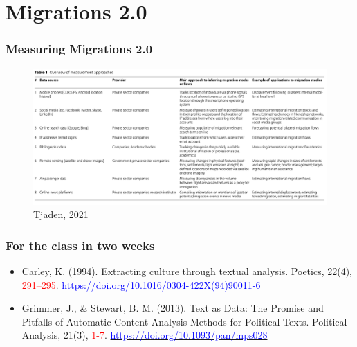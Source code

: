\documentclass[aspectratio=169]{beamer}
\begin{document}
\section{Migrations 2.0}

\begin{frame}
    \frametitle{Measuring Migrations 2.0}
    \begin{figure}
        \includegraphics[width = \textwidth]{png/table.png}
        \caption{Tjaden, 2021}
    \end{figure}
\end{frame}

\begin{frame}
    \frametitle{For the class in two weeks}
    \begin{itemize}
        \item Carley, K. (1994). Extracting culture through textual analysis. Poetics, 22(4), \textcolor{red}{291–295}. \href{https://doi.org/10.1016/0304-422X(94)90011-6}{\textcolor{blue}{https://doi.org/10.1016/0304-422X(94)90011-6}}
        \item Grimmer, J., \& Stewart, B. M. (2013). Text as Data: The Promise and Pitfalls of Automatic Content Analysis Methods for Political Texts. Political Analysis, 21(3), \textcolor{red}{1-7}. \href{https://doi.org/10.1093/pan/mps028}{\textcolor{blue}{https://doi.org/10.1093/pan/mps028}}
    \end{itemize}
\end{frame}
\end{document}
